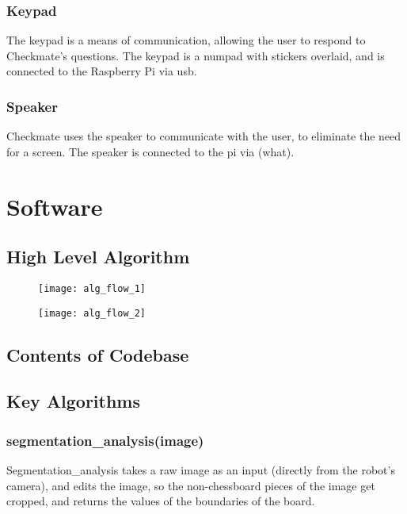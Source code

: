 \documentclass[onecolumn]{IEEEtran}
\begin{document}
\subsubsection{Keypad}
The keypad is a means of communication, allowing the user to respond to Checkmate's questions. The keypad is a numpad with stickers overlaid, and is connected to the Raspberry Pi via usb. 
\subsubsection{Speaker}
Checkmate uses the speaker to communicate with the user, to eliminate the need for a screen. The speaker is connected to the pi via (what). 
\section{Software}
\subsection{High Level Algorithm}

\begin{figure}[h!]
\centering
\begin{minipage}{.55\textwidth}
  \centering
  \texttt{[image: alg\_flow\_1]}
  \label{fig:test1}
\end{minipage}%
\hspace{-3.75cm}
\begin{minipage}{.65\textwidth}
  \centering
  \texttt{[image: alg\_flow\_2]}
  \label{fig:test2}
\end{minipage}
\end{figure}

\subsection{Contents of Codebase}
\subsection{Key Algorithms}
\subsubsection{segmentation\_analysis(image)}
Segmentation\_analysis takes a raw image as an input (directly from the robot's camera), and edits the image, so the non-chessboard pieces of the image get cropped, and returns the values of the boundaries of the board. 
\end{document}
